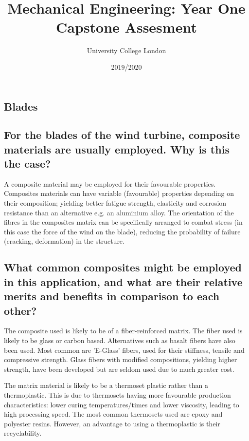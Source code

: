 \documentclass[12pt]{article}
\newcommand{\citeprimsec}[2]{\citep[][cited by \citealp{#2}]{#1}}
\begin{document}
\title{Mechanical Engineering: Year One Capstone Assesment}
\date{2019/2020}
\author{University College London}
\maketitle
\begin{flushleft}

\tableofcontents

\section{Blades}
\subsection{For the blades of the wind turbine, composite materials are usually employed. Why is this the case?}
A composite material may be employed for their favourable properties. Composites materials can have variable (favourable) properties depending on their composition; yielding better fatigue strength, elasticity and corrosion resistance than an alternative e.g. an aluminium alloy. The orientation of the fibres in the composites matrix can be specifically arranged to combat stress (in this case the force of the wind on the blade), reducing the probability of failure (cracking, deformation) in the structure.

\subsection{What common composites might be employed in this application, and what are their relative merits and benefits in comparison to each other?}
The composite used is likely to be of a fiber-reinforced matrix. The fiber used is likely to be glass or carbon based. Alternatives such as basalt fibers have also been used. Most common are 'E-Glass' fibers, used for their stiffness, tensile and compressive strength. Glass fibers with modified compositions, yielding higher strength, have been developed but are seldom used due to much greater cost.

The matrix material is likely to be a thermoset plastic rather than a thermoplastic. This is due to thermosets having more favourable production characteristics: lower curing temperatures/times and lower viscosity, leading to high processing speed. The most common thermosets used are epoxy and polyester resins. However, an advantage to using a thermoplastic is their recyclability. \citeprimsec{windTurbineMaterial2}{windTurbineMaterial} 


\end{flushleft}
\end{document}
